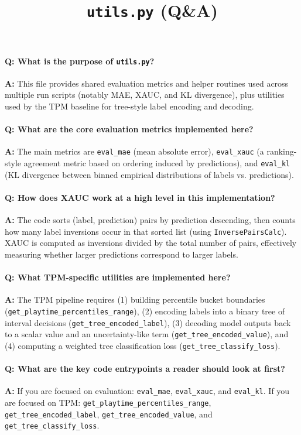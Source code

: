\documentclass[11pt]{article}
\title{\texttt{utils.py} (Q\&A)}
\author{}
\date{}
\begin{document}
\maketitle

\paragraph{Q: What is the purpose of \texttt{utils.py}?}
\textbf{A:} This file provides shared evaluation metrics and helper routines used across multiple run scripts (notably MAE, XAUC, and KL divergence), plus utilities used by the TPM baseline for tree-style label encoding and decoding.

\paragraph{Q: What are the core evaluation metrics implemented here?}
\textbf{A:} The main metrics are \lstinline|eval_mae| (mean absolute error), \lstinline|eval_xauc| (a ranking-style agreement metric based on ordering induced by predictions), and \lstinline|eval_kl| (KL divergence between binned empirical distributions of labels vs. predictions).

\paragraph{Q: How does XAUC work at a high level in this implementation?}
\textbf{A:} The code sorts (label, prediction) pairs by prediction descending, then counts how many label inversions occur in that sorted list (using \lstinline|InversePairsCalc|). XAUC is computed as inversions divided by the total number of pairs, effectively measuring whether larger predictions correspond to larger labels.

\paragraph{Q: What TPM-specific utilities are implemented here?}
\textbf{A:} The TPM pipeline requires (1) building percentile bucket boundaries (\lstinline|get_playtime_percentiles_range|), (2) encoding labels into a binary tree of interval decisions (\lstinline|get_tree_encoded_label|), (3) decoding model outputs back to a scalar value and an uncertainty-like term (\lstinline|get_tree_encoded_value|), and (4) computing a weighted tree classification loss (\lstinline|get_tree_classify_loss|).

\paragraph{Q: What are the key code entrypoints a reader should look at first?}
\textbf{A:} If you are focused on evaluation: \lstinline|eval_mae|, \lstinline|eval_xauc|, and \lstinline|eval_kl|. If you are focused on TPM: \lstinline|get_playtime_percentiles_range|, \lstinline|get_tree_encoded_label|, \lstinline|get_tree_encoded_value|, and \lstinline|get_tree_classify_loss|.
\end{document}

